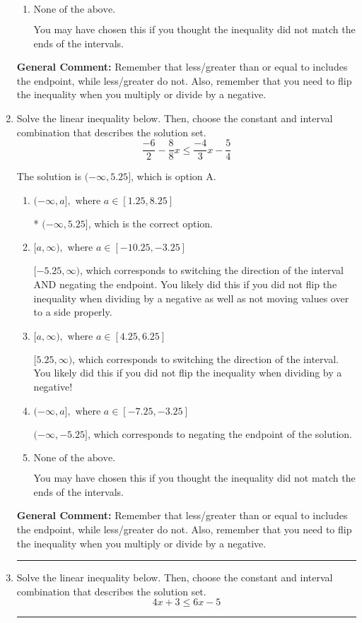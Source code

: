 \documentclass{extbook}[14pt]
\newcommand{\litem}[1]{\item #1

\rule{\textwidth}{0.4pt}}
\begin{document}
\begin{enumerate}
{\begin{enumerate}[label=\Alph*.]
 $(-\infty, -2.489]$, which corresponds to switching the direction of the interval AND negating the endpoint. You likely did this if you did not flip the inequality when dividing by a negative as well as not moving values over to a side properly.
\item \( \text{None of the above}. \)

You may have chosen this if you thought the inequality did not match the ends of the intervals.
\end{enumerate}

\textbf{General Comment:} Remember that less/greater than or equal to includes the endpoint, while less/greater do not. Also, remember that you need to flip the inequality when you multiply or divide by a negative.
}
\litem{
Solve the linear inequality below. Then, choose the constant and interval combination that describes the solution set.
\[ \frac{-6}{2} - \frac{8}{8} x \leq \frac{-4}{3} x - \frac{5}{4} \]

The solution is \( (-\infty, 5.25] \), which is option A.\begin{enumerate}[label=\Alph*.]
\item \( (-\infty, a], \text{ where } a \in [1.25, 8.25] \)

* $(-\infty, 5.25]$, which is the correct option.
\item \( [a, \infty), \text{ where } a \in [-10.25, -3.25] \)

 $[-5.25, \infty)$, which corresponds to switching the direction of the interval AND negating the endpoint. You likely did this if you did not flip the inequality when dividing by a negative as well as not moving values over to a side properly.
\item \( [a, \infty), \text{ where } a \in [4.25, 6.25] \)

 $[5.25, \infty)$, which corresponds to switching the direction of the interval. You likely did this if you did not flip the inequality when dividing by a negative!
\item \( (-\infty, a], \text{ where } a \in [-7.25, -3.25] \)

 $(-\infty, -5.25]$, which corresponds to negating the endpoint of the solution.
\item \( \text{None of the above}. \)

You may have chosen this if you thought the inequality did not match the ends of the intervals.
\end{enumerate}

\textbf{General Comment:} Remember that less/greater than or equal to includes the endpoint, while less/greater do not. Also, remember that you need to flip the inequality when you multiply or divide by a negative.
}
\litem{
Solve the linear inequality below. Then, choose the constant and interval combination that describes the solution set.
\[ 4x + 3 \leq 6x -5 \]

}
\end{enumerate}
\end{document}
